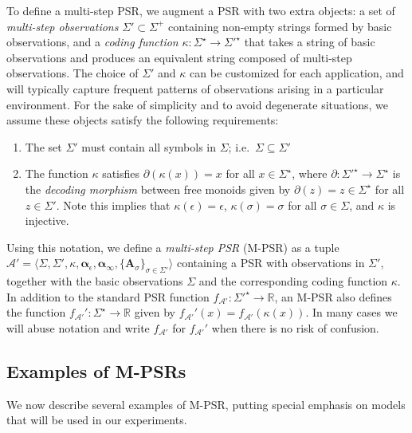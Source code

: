 \documentclass[letterpaper]{article}
\newcommand{\mat}[1]{\mathbf{#1}}
\newcommand{\A}{\mat{A}}
\newcommand{\Rset}{\mathbb{R}}
\newcommand{\R}{\Rset}
\newcommand{\sstar}{\Sigma^\star}
\newcommand{\aone}{\boldsymbol{\alpha}_\epsilon}
\newcommand{\ainf}{\boldsymbol{\alpha}_{\infty}}
\newcommand{\psrA}{\mathcal{A}}
\newcommand{\mpsrsigma}{\langle \Sigma, \Sigma', \kappa, \aone, \ainf, \{\A_\sigma\}_{\sigma \in \Sigma'} \rangle}
\begin{document}
To define a multi-step PSR, we augment a PSR with two extra objects: a set of \emph{multi-step observations} $\Sigma' \subset \Sigma^+$ containing non-empty strings formed by basic observations, and a \emph{coding function} $\kappa : \Sigma^\star \to {\Sigma'}^{\star}$ that takes a string of basic observations and produces an equivalent string composed of multi-step observations.
%
The choice of $\Sigma'$ and $\kappa$ can be customized for each application, and will typically capture frequent patterns of observations arising in a particular environment. For the sake of simplicity and to avoid degenerate situations, we assume these objects satisfy the following requirements:
\begin{enumerate}
\item The set $\Sigma'$ must contain all symbols in $\Sigma$; i.e.\ $\Sigma \subseteq \Sigma'$
\item The function $\kappa$ satisfies $\partial(\kappa(x)) = x$ for all $x \in \Sigma^\star$, where $\partial : {\Sigma'}^\star \to \Sigma^\star$ is the \emph{decoding morphism} between free monoids given by $\partial(z) = z \in \Sigma^\star$ for all $z \in \Sigma'$. Note this implies that $\kappa(\epsilon) = \epsilon$, $\kappa(\sigma) = \sigma$ for all $\sigma \in \Sigma$, and $\kappa$ is injective.
\end{enumerate}
Using this notation, we define a \emph{multi-step PSR} (M-PSR) as a tuple $\psrA' = \mpsrsigma$ containing a PSR with observations in $\Sigma'$, together with the basic observations $\Sigma$ and the corresponding coding function $\kappa$. In addition to the standard PSR function $f_{\psrA'} : {\Sigma'}^\star \to \R$, an M-PSR also defines the function $f_{\psrA'}' : \sstar \to \R$ given by $f_{\psrA'}'(x) = f_{\psrA'}(\kappa(x))$. In many cases we will abuse  notation and write $f_{\psrA'}$ for $f_{\psrA'}'$ when there is no risk of confusion.

\subsection{Examples of M-PSRs}

We now describe several examples of M-PSR, putting special emphasis on models that will be used in our experiments.
\end{document}

